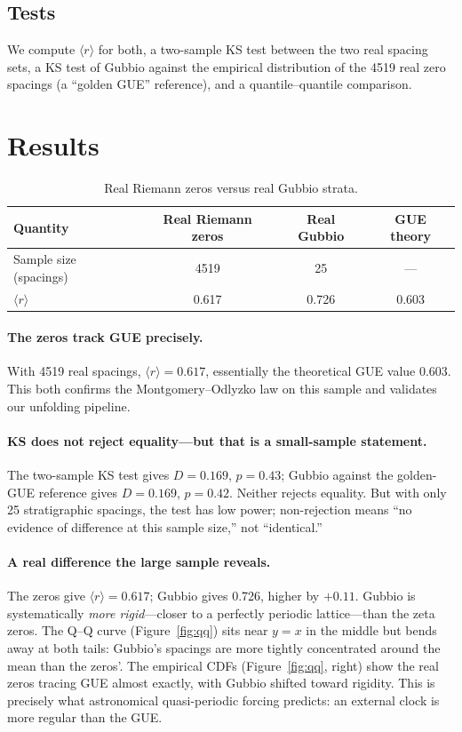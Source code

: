 \documentclass[12pt,a4paper]{article}
\begin{document}
\subsection{Tests}
We compute $\langle r\rangle$ for both, a two-sample KS test between the two real spacing sets, a KS test of Gubbio against the empirical distribution of the 4519 real zero spacings (a ``golden GUE'' reference), and a quantile--quantile comparison.

\section{Results}

\begin{table}[H]
\centering
\caption{Real Riemann zeros versus real Gubbio strata.}
\label{tab:main}
\small
\begin{tabular}{lccc}
\toprule
Quantity & Real Riemann zeros & Real Gubbio & GUE theory \\
\midrule
Sample size (spacings) & 4519 & 25 & --- \\
$\langle r\rangle$ & 0.617 & 0.726 & 0.603 \\
\bottomrule
\end{tabular}
\end{table}

\paragraph{The zeros track GUE precisely.} With 4519 real spacings, $\langle r\rangle = 0.617$, essentially the theoretical GUE value 0.603. This both confirms the Montgomery--Odlyzko law on this sample and validates our unfolding pipeline.

\paragraph{KS does not reject equality---but that is a small-sample statement.} The two-sample KS test gives $D=0.169$, $p=0.43$; Gubbio against the golden-GUE reference gives $D=0.169$, $p=0.42$. Neither rejects equality. But with only 25 stratigraphic spacings, the test has low power; non-rejection means ``no evidence of difference at this sample size,'' not ``identical.''

\paragraph{A real difference the large sample reveals.} The zeros give $\langle r\rangle=0.617$; Gubbio gives 0.726, higher by $+0.11$. Gubbio is systematically \emph{more rigid}---closer to a perfectly periodic lattice---than the zeta zeros. The Q--Q curve (Figure~\ref{fig:qq}) sits near $y=x$ in the middle but bends away at both tails: Gubbio's spacings are more tightly concentrated around the mean than the zeros'. The empirical CDFs (Figure~\ref{fig:qq}, right) show the real zeros tracing GUE almost exactly, with Gubbio shifted toward rigidity. This is precisely what astronomical quasi-periodic forcing predicts: an external clock is more regular than the GUE.
\end{document}
